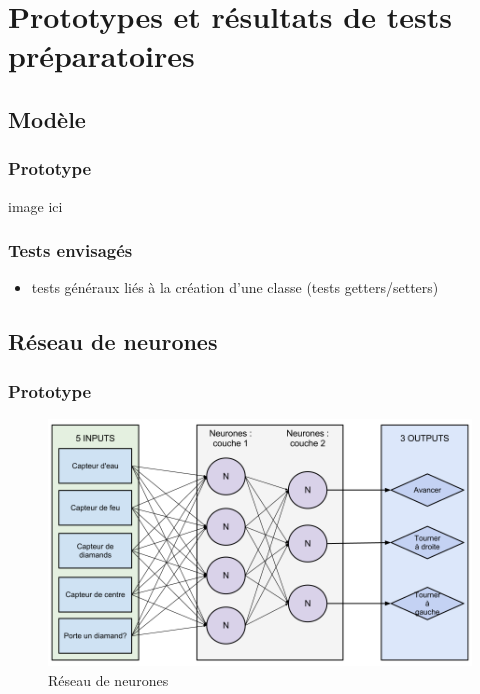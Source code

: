 \chapter{Prototypes et résultats de tests préparatoires}


\section{Modèle}
\subsection{Prototype}
image ici

\subsection{Tests envisagés}
\begin{itemize}
  \item tests généraux liés à la création d'une classe (tests getters/setters) \\

\end{itemize}


\section{Réseau de neurones}
\subsection{Prototype}
\begin{figure}[H]
    \centering
    \includegraphics[width=1\textwidth]{./pictures/reseau_neurones.png}
    \caption{Réseau de neurones}
\end{figure}


